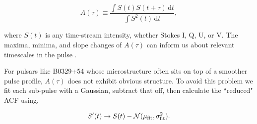 \begin{equation}
A(\tau) \equiv \frac{\int S(t)S(t + \tau) \, \textrm{d}t}{\int S^2(t)
\, \textrm{d}t},
\end{equation}

\noindent where $S(t)$ is any time-stream intensity, 
whether Stokes I, Q, U, or V. 
The maxima, minima, and slope changes of $A(\tau)$ 
can inform us about relevant timescales in the pulse
\citep{2015ApJ...806..236M}. 

For pulsars like B0329+54 whose microstructure often 
sits on top of a smoother pulse profile, $A(\tau)$
does not exhibit obvious structure. To avoid this problem 
we fit each sub-pulse with a Gaussian, subtract 
that off, then calculate the ``reduced" ACF using,

\begin{equation}
S'(t) \rightarrow S(t) - \mathcal{N}(\mu_{\rm fit}, \sigma^2_{\rm fit}).
\end{equation}



